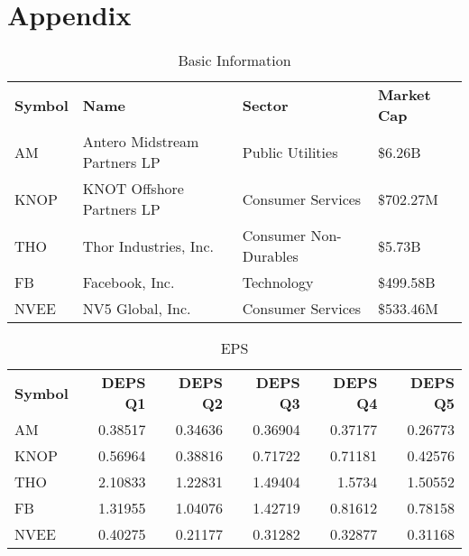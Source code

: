 \documentclass{article}
\begin{document}
\section{Appendix}
\begin{table}[htbp]
  \centering
  \caption{Basic Information}
    \begin{tabular}{llll}
    \textbf{Symbol} & \textbf{Name} & \textbf{Sector} & \textbf{Market Cap} \\
    AM    & Antero Midstream Partners LP & Public Utilities & \$6.26B \\
    KNOP  & KNOT Offshore Partners LP & Consumer Services & \$702.27M \\
    THO   & Thor Industries, Inc. & Consumer Non-Durables & \$5.73B \\
    FB    & Facebook, Inc. & Technology & \$499.58B \\
    NVEE  & NV5 Global, Inc. & Consumer Services & \$533.46M \\
    \end{tabular}%
  \label{tab:addlabel}%
\end{table}%

\begin{table}[htbp]
  \centering
  \caption{EPS}
    \begin{tabular}{lrrrrr}
    \multicolumn{1}{p{4.215em}}{\textbf{Symbol}} & \multicolumn{1}{p{4.215em}}{\textbf{DEPS Q1}} & \multicolumn{1}{p{4.215em}}{\textbf{DEPS Q2}} & \multicolumn{1}{p{4.215em}}{\textbf{DEPS Q3}} & \multicolumn{1}{p{4.215em}}{\textbf{DEPS Q4}} & \multicolumn{1}{p{4.215em}}{\textbf{DEPS Q5}} \\
    AM    & 0.38517 & 0.34636 & 0.36904 & 0.37177 & 0.26773 \\
    KNOP  & 0.56964 & 0.38816 & 0.71722 & 0.71181 & 0.42576 \\
    THO   & 2.10833 & 1.22831 & 1.49404 & 1.5734 & 1.50552 \\
    FB    & 1.31955 & 1.04076 & 1.42719 & 0.81612 & 0.78158 \\
    NVEE  & 0.40275 & 0.21177 & 0.31282 & 0.32877 & 0.31168 \\
    \end{tabular}%
  \label{tab:addlabel}%
\end{table}%
\end{document}
